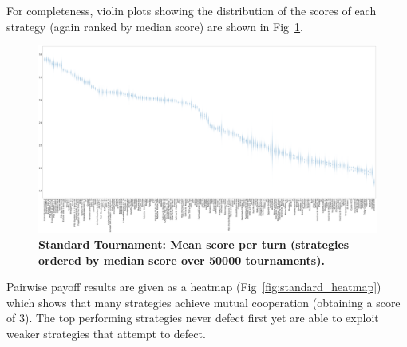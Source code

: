 \documentclass[10pt,letterpaper]{article}
\begin{document}
For completeness, violin plots showing the distribution of the scores of each
strategy (again ranked by median score) are shown in
Fig~\ref{fig:standard_boxplot}.

\begin{landscape}
    \begin{figure}[!hbtp]
        \centering
        \includegraphics[width=\paperwidth]{standard_scores_boxplots.pdf}
        \caption{\bf Standard Tournament: Mean score per turn 
            (strategies ordered by median score over 50000 tournaments).}
        \label{fig:standard_boxplot}
    \end{figure}
\end{landscape}

Pairwise payoff results are given as a heatmap (Fig~\ref{fig:standard_heatmap})
which shows that many strategies achieve mutual cooperation (obtaining a score
of 3). The top performing
strategies never defect first yet are able to exploit weaker strategies that
attempt to defect.
\end{document}
